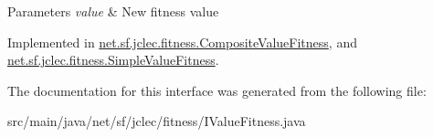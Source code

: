 \begin{DoxyParams}{Parameters}
{\em value} & New fitness value \\
\hline
\end{DoxyParams}


Implemented in \hyperlink{classnet_1_1sf_1_1jclec_1_1fitness_1_1_composite_value_fitness_a2289464a4aece8cb6d5ea230205e0362}{net.\-sf.\-jclec.\-fitness.\-Composite\-Value\-Fitness}, and \hyperlink{classnet_1_1sf_1_1jclec_1_1fitness_1_1_simple_value_fitness_a065805eb9fd5cd6749925b7de0beb979}{net.\-sf.\-jclec.\-fitness.\-Simple\-Value\-Fitness}.



The documentation for this interface was generated from the following file\-:\begin{DoxyCompactItemize}
\item 
src/main/java/net/sf/jclec/fitness/I\-Value\-Fitness.\-java\end{DoxyCompactItemize}
